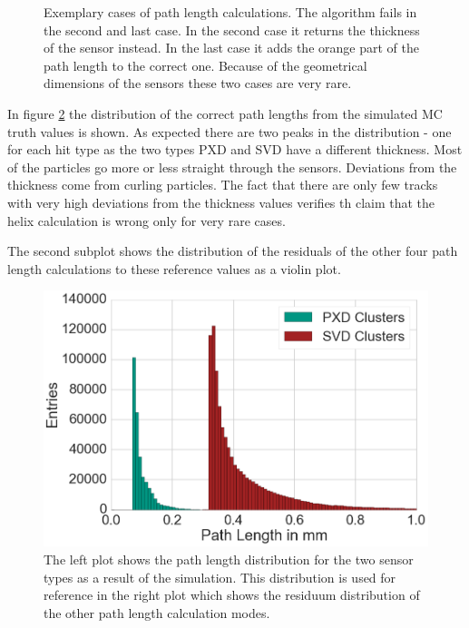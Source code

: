 \begin{figure}
  \caption{Exemplary cases of path length calculations. The algorithm fails in the second and last case. In the second case it returns the thickness of the sensor instead. In the last case it adds the orange part of the path length to the correct one. Because of the geometrical dimensions of the sensors these two cases are very rare.}
  \label{fig-errors-in-path-length}
\end{figure}

In figure \ref{fig-pathlengths} the distribution of the correct path lengths from the simulated MC truth values is shown. As expected there are two peaks in the distribution - one for each hit type as the two types PXD and SVD have a different thickness. Most of the particles go more or less straight through the sensors. Deviations from the thickness come from curling particles. The fact that there are only few tracks with very high deviations from the thickness values verifies th claim that the helix calculation is wrong only for very rare cases.

The second subplot shows the distribution of the residuals of the other four path length calculations to these reference values as a violin plot.


\begin{figure}
 \centering
  \includegraphics[width=0.5\linewidth]{figures/vxd/pathlengthHitType.png}
 \caption{The left plot shows the path length distribution for the two sensor types as a result of the simulation. This distribution is used for reference in the right plot which shows the residuum distribution of the other path length calculation modes.}
 \label{fig-pathlengths}
\end{figure}


